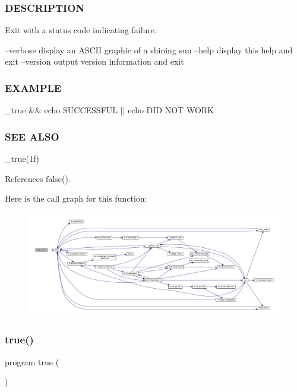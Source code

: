 \subsubsection*{D\+E\+S\+C\+R\+I\+P\+T\+I\+ON}

Exit with a status code indicating failure.

--verbose display an A\+S\+C\+II graphic of a shining sun --help display this help and exit --version output version information and exit

\subsubsection*{E\+X\+A\+M\+P\+LE}

\begin{DoxyVerb}    _true && echo SUCCESSFUL || echo DID NOT WORK
\end{DoxyVerb}
 \subsubsection*{S\+EE A\+L\+SO}

\+\_\+true(1f) 

References false().

Here is the call graph for this function\+:
\nopagebreak
\begin{figure}[H]
\begin{center}
\leavevmode
\includegraphics[width=350pt]{__true_8f90_a39c21619b08a3c22f19e2306efd7f766_cgraph}
\end{center}
\end{figure}
\mbox{\label{__true_8f90_a7ed1d79677aed1b23489a4fe0bd16daa}} 
\subsubsection{\texorpdfstring{true()}{true()}}
{\footnotesize\ttfamily program true (\begin{DoxyParamCaption}{ }\end{DoxyParamCaption})}




